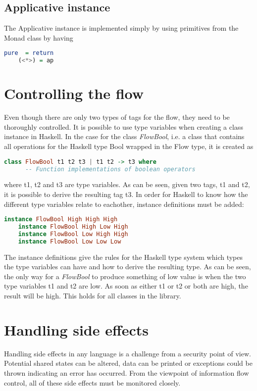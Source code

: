 \subsection{Applicative instance}
The Applicative instance is implemented simply by using primitives from the Monad class by having
\begin{center}
  \begin{lstlisting}[language=Haskell]
    pure  = return
    (<*>) = ap
  \end{lstlisting}
\end{center}

\section{Controlling the flow}
Even though there are only two types of tags for the flow, they need to be thoroughly controlled. It is possible to use type variables when creating a class instance in Haskell. In the case for the class \emph{FlowBool}, i.e. a class that contains all operations for the Haskell type Bool wrapped in the Flow type, it is created as
\begin{center}
  \begin{lstlisting}[language=Haskell]
    class FlowBool t1 t2 t3 | t1 t2 -> t3 where
      -- Function implementations of boolean operators
  \end{lstlisting}
\end{center}
where t1, t2 and t3 are type variables. As can be seen, given two tags, t1 and t2, it is possible to derive the resulting tag t3. In order for Haskell to know how the different type variables relate to eachother, instance definitions must be added:
\begin{center}
  \begin{lstlisting}[language=Haskell]
    instance FlowBool High High High
    instance FlowBool High Low High
    instance FlowBool Low High High
    instance FlowBool Low Low Low
  \end{lstlisting}
\end{center}
The instance definitions give the rules for the Haskell type system which types the type variables can have and how to derive the resulting type. As can be seen, the only way for a \emph{FlowBool} to produce something of low value is when the two type variables t1 and t2 are low. As soon as either t1 or t2 or both are high, the result will be high. This holds for all classes in the library.

\section{Handling side effects}
Handling side effects in any language is a challenge from a security point of view. Potential shared states can be altered, data can be printed or exceptions could be thrown indicating an error has occurred. From the viewpoint of information flow control, all of these side effects must be monitored closely.

